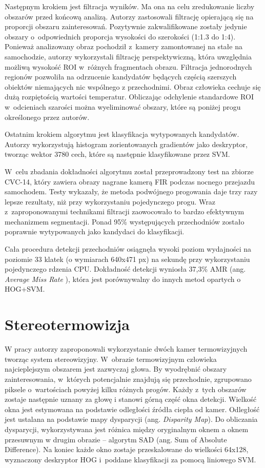 Następnym krokiem jest filtracja wyników.
Ma ona na celu zredukowanie liczby obszarów przed końcową analizą.
Autorzy zastosowali filtrację opierającą się na proporcji obszaru zainteresowań.
Pozytywnie zakwalifikowane zostały jedynie obszary o~odpowiednich proporcja wysokości do szerokości (1:1.3 do 1:4).
Ponieważ analizowany obraz pochodził z~kamery zamontowanej na stałe na samochodzie, autorzy wykorzystali filtrację perspektywiczną, która uwzględnia możliwą wysokość ROI w~różnych fragmentach obrazu.
Filtracja jednorodnych regionów pozwoliła na odrzucenie kandydatów będących częścią szerszych obiektów niemających nic wspólnego z przechodnimi. 
Obraz człowieka cechuje się dużą rozpiętością wartości temperatur. 
Obliczając odchylenie standardowe ROI w~odcieniach szarości można wyeliminować obszary, które są poniżej progu określonego przez autorów. 

Ostatnim krokiem algorytmu jest klasyfikacja wytypowanych kandydatów.
Autorzy wykorzystują histogram zorientowanych gradientów jako deskryptor, tworząc wektor 3780 cech, które są następnie klasyfikowane przez SVM.

W~celu zbadania dokładności algorytmu został przeprowadzony test na zbiorze CVC-14, który zawiera obrazy nagrane kamerą FIR podczas nocnego przejazdu samochodem.
Testy wykazały, że metoda podwójnego progowania daje trzy razy lepsze rezultaty, niż przy wykorzystaniu pojedynczego progu. 
Wraz z~zaproponowanymi technikami filtracji zaowocowało to bardzo efektywnym mechanizmem segmentacji. 
Ponad 95\% występujących przechodniów zostało poprawnie wytypowanych jako kandydaci do klasyfikacji.

Cała procedura detekcji przechodniów osiągnęła wysoki poziom wydajności na poziomie 33 klatek (o wymiarach 640x471 px) na sekundę przy wykorzystaniu pojedynczego rdzenia CPU. 
Dokładność detekcji wyniosła 37,3\% AMR
(ang. \textit{ Average Miss Rate }), która jest porównywalny do innych metod opartych o HOG+SVM.

\section{Stereotermowizja}

W pracy \cite{suard2006pedestrian} autorzy zaproponowali wykorzystanie dwóch kamer termowizyjnych tworząc system stereowizyjny. 
W~obrazie termowizyjnym człowieka najcieplejszym obszarem jest zazwyczaj głowa. 
By wyodrębnić obszary zainteresowania, w~których potencjalnie znajdują się przechodnie, zgrupowano piksele o~wartościach powyżej kilku różnych progów. 
Każdy z~tych obszarów zostaje następnie uznany za głowę i stanowi górną część okna detekcji. 
Wielkość okna jest estymowana na podstawie odległości źródła ciepła od kamer. 
Odległość jest ustalana na podstawie mapy dysparycji (ang. \textit{Disparity Map}). 
Do obliczania dysparycji, wykorzystywana jest różnica między oryginalnym oknem a oknem przesuwnym w drugim obrazie -- algorytm SAD (ang. Sum of Absolute Difference). 
Na koniec każde okno zostaje przeskalowane do wielkości 64x128, wyznaczony deskryptor HOG i~poddane klasyfikacji za pomocą liniowego SVM. 



